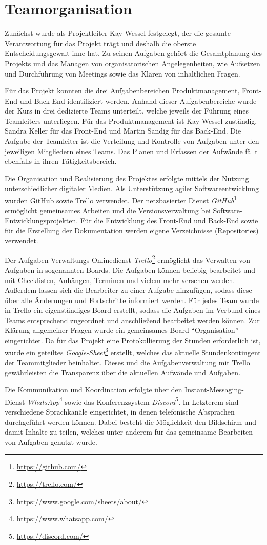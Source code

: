 \section{Teamorganisation}
Zunächst wurde als Projektleiter Kay Wessel festgelegt, der die gesamte Verantwortung für das Projekt trägt und deshalb die oberste Entscheidungsgewalt inne hat. 
Zu seinen Aufgaben gehört die Gesamtplanung des Projekts und das Managen von organisatorischen Angelegenheiten, wie Aufsetzen und Durchführung von Meetings sowie das Klären von inhaltlichen Fragen.

Für das Projekt konnten die drei Aufgabenbereichen Produktmanagement, Front-End und Back-End identifiziert werden.
Anhand dieser Aufgabenbereiche wurde der Kurs in drei dedizierte Teams unterteilt, welche jeweils der Führung eines Teamleiters unterliegen.
Für das Produktmanagement ist Kay Wessel zuständig, Sandra Keller für das Front-End und Martin Sandig für das Back-End.
Die Aufgabe der Teamleiter ist die Verteilung und Kontrolle von Aufgaben unter den jeweiligen Mitgliedern eines Teams.
Das Planen und Erfassen der Aufwände fällt ebenfalls in ihren Tätigkeitsbereich.

Die Organisation und Realisierung des Projektes erfolgte mittels der Nutzung unterschiedlicher digitaler Medien.
Als Unterstützung agiler Softwareentwicklung wurden GitHub sowie Trello verwendet. 
Der netzbasierter Dienst \textit{GitHub}\footnote{\url{https://github.com/}} ermöglicht gemeinsames Arbeiten und die Versionsverwaltung bei Software-Entwicklungsprojekten. 
Für die Entwicklung des Front-End und Back-End sowie für die Erstellung der Dokumentation werden eigene Verzeichnisse (Repositories) verwendet. 

Der Aufgaben-Verwaltungs-Onlinedienst \textit{Trello}\footnote{\url{https://trello.com/}} ermöglicht das Verwalten von Aufgaben in sogenannten Boards. 
Die Aufgaben können beliebig bearbeitet und mit Checklisten, Anhängen, Terminen und vielem mehr versehen werden.
Außerdem lassen sich die Bearbeiter zu einer Aufgabe hinzufügen, sodass diese über alle Änderungen und Fortschritte informiert werden.
Für jedes Team wurde in Trello ein eigenständiges Board erstellt, sodass die Aufgaben im Verbund eines Teams entsprechend zugeordnet und anschließend bearbeitet werden können. 
Zur Klärung allgemeiner Fragen wurde ein gemeinsames Board \enquote{Organisation} eingerichtet.
Da für das Projekt eine Protokollierung der Stunden erforderlich ist, wurde ein geteiltes \textit{Google-Sheet}\footnote{\url{https://www.google.com/sheets/about/}} erstellt, welches das aktuelle Stundenkontingent der Teammitglieder beinhaltet. 
Dieses und die Aufgabenverwaltung mit Trello gewährleisten die Transparenz über die aktuellen Aufwände und Aufgaben. 

Die Kommunikation und Koordination erfolgte über den Instant-Messaging-Dienst \textit{WhatsApp}\footnote{\url{https://www.whatsapp.com/}} sowie das Konferenzsystem \textit{Discord}\footnote{\url{https://discord.com/}}.
In Letzterem sind verschiedene Sprachkanäle eingerichtet, in denen telefonische Absprachen durchgeführt werden können.
Dabei besteht die Möglichkeit den Bildschirm und damit Inhalte zu teilen, welches unter anderem für das gemeinsame Bearbeiten von Aufgaben genutzt wurde. 
